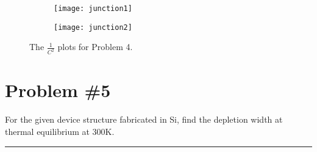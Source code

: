 \documentclass{article}
\newcommand{\horline}
           {\begin{center}
              \noindent\rule{8cm}{0.4pt}
            \end{center}}
\begin{document}
\begin{figure}[ht!]
  \centering
  \begin{subfigure}[b]{\textwidth}
    \texttt{[image: junction1]}
  \end{subfigure} 

  \begin{subfigure}[b]{\textwidth}
    \texttt{[image: junction2]}
  \end{subfigure}
  \caption{The $\frac{1}{C^2}$ plots for Problem 4. \label{fig:capplots}}
\end{figure}

\pagebreak

\section*{Problem \#5}
For the given device structure fabricated in Si, find the depletion width
at thermal equilibrium at 300K.
\horline
\end{document}
